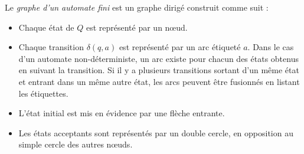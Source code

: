 Le \emph{graphe d'un automate fini} \automaton est un graphe dirigé construit comme suit :

\begin{itemize}
  \item Chaque état de $Q$ est représenté par un nœud.
  \item Chaque transition $\delta(q,a)$ est représenté par un arc étiqueté $a$. Dans le cas d'un automate non-déterministe, un arc existe pour chacun des états obtenus en suivant la transition. Si il y a plusieurs transitions sortant d'un même état et entrant dans un même autre état, les arcs peuvent être fusionnés en listant les étiquettes.
  \item L'état initial est mis en évidence par une flèche entrante.
  \item Les états acceptants sont représentés par un double cercle, en opposition au simple cercle des autres nœuds.
\end{itemize}

